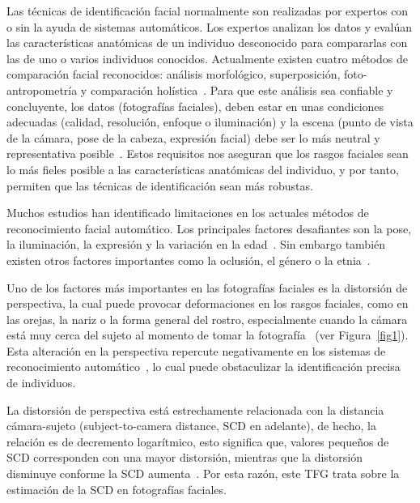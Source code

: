 Las técnicas de identificación facial normalmente son realizadas por expertos con o sin la ayuda de sistemas automáticos. Los expertos analizan los datos y evalúan las características anatómicas de un individuo desconocido para compararlas con las de uno o varios individuos conocidos. Actualmente existen cuatro métodos de comparación facial reconocidos: análisis morfológico, superposición, foto-antropometría y comparación holística~\cite{3}.
Para que este análisis sea confiable y concluyente, los datos (fotografías faciales), deben estar en unas condiciones adecuadas (calidad, resolución, enfoque o iluminación) y la escena (punto de vista de la cámara, pose de la cabeza, expresión facial) debe ser lo más neutral y representativa posible~\cite{1,2}. Estos requisitos nos aseguran que los rasgos faciales sean lo más fieles posible a las características anatómicas del individuo, y por tanto, permiten que las técnicas de identificación sean más robustas.

Muchos estudios han identificado limitaciones en los actuales métodos de reconocimiento facial automático. Los principales factores desafiantes son la pose, la iluminación, la expresión y la variación en la edad~\cite{4,6}. Sin embargo también existen otros factores importantes como la oclusión, el género o la etnia~\cite{5,7}.

Uno de los factores más importantes en las fotografías faciales es la distorsión de perspectiva, la cual puede provocar deformaciones en los rasgos faciales, como en las orejas, la nariz o la forma general del rostro, especialmente cuando la cámara está muy cerca del sujeto al momento de tomar la fotografía~\cite{12} (ver Figura~\ref{fig1}). Esta alteración en la perspectiva repercute negativamente en los sistemas de reconocimiento automático~\cite{9,10,11}, lo cual puede obstaculizar la identificación precisa de individuos. 

La distorsión de perspectiva está estrechamente relacionada con la distancia cámara-sujeto (subject-to-camera distance, SCD en adelante), de hecho, la relación es de decremento logarítmico, esto significa que, valores pequeños de SCD corresponden con una mayor distorsión, mientras que la distorsión disminuye conforme la SCD aumenta~\cite{23}. Por esta razón, este TFG trata sobre la estimación de la SCD en fotografías faciales.

